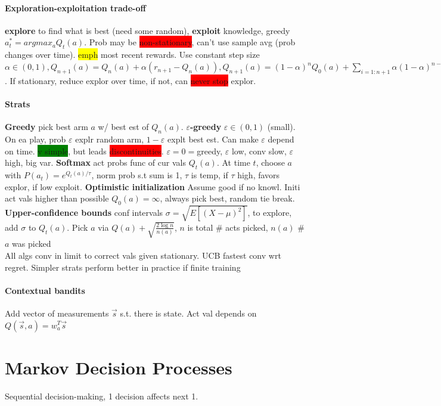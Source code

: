 \paragraph{Exploration-exploitation trade-off} \textbf{explore} to
find what is best (need some random), \textbf{exploit} knowledge,
greedy $a_t^* = argmax_a Q_t(a)$. Prob may be
\colorbox{red}{non-stationary}, can't use sample avg (prob changes
over time). \colorbox{yellow}{emph} most recent rewards. Use constant
step size $\alpha \in (0,1),Q_{n+1}(a)=Q_n(a)+\alpha(r_{n+1}-Q_n(a)),
Q_{n+1}(a)=(1-\alpha)^nQ_0(a)+\sum_{i=1:n+1}\alpha(1-\alpha)^{n-i-1}r_i$. If
stationary, reduce explor over time, if not, can \colorbox{red}{never
  stop} explor.
\paragraph{Strats}
\textbf{Greedy} pick best arm $a$ w/ best est of
$Q_n(a)$. \textbf{$\varepsilon$-greedy} $\varepsilon\in (0,1)$
(small). On ea play, prob $\varepsilon$ explr random arm,
$1-\varepsilon$ explt best est. Can make $\varepsilon$ depend on
time. \colorbox{green}{v simple}, but leads
\colorbox{red}{discontinuities}. $\varepsilon=0=$greedy, $\varepsilon$
low, conv slow, $\varepsilon$ high, big var. \textbf{Softmax} act
probs func of cur vals $Q_t(a)$. At time $t$, choose $a$ with
$P(a_t)=e^{Q_t(a)/\tau}$, norm prob s.t sum is 1, $\tau$ is temp, if
$\tau$ high, favors explor, if low exploit. \textbf{Optimistic
  initialization} Assume good if no knowl. Initi act vals higher than
possible $Q_0(a)=\infty$, always pick best, random tie
break. \textbf{Upper-confidence bounds} conf intervals $\sigma = \sqrt{E[(X-\mu)^2]}$,
to explore, add $\sigma$ to $Q_t(a)$. Pick
$a$ via $Q(a)+\sqrt{\frac{2\log n}{n(a)}}$, $n$ is total \# acts
picked, $n(a)$ \# $a$ was picked
\\ All algs conv in limit to correct vals given stationary. UCB
fastest conv wrt regret. Simpler strats perform better in practice if
finite training
\paragraph{Contextual bandits} Add vector of measurements $\vec{s}$
s.t. there is state. Act val depends on $Q(\vec{s},a)=w_a^T \vec{s}$

\color[HTML]{DF541E}
\section{Markov Decision Processes}
Sequential decision-making, 1 decision affects next 1.
